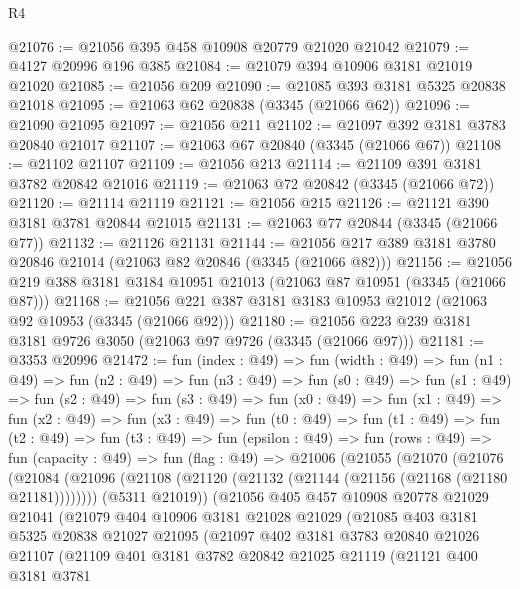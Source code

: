 \begin{lexlean}{R4}
\begin{coremodule}
@21076 := @21056 @395 @458 @10908 @20779 @21020 @21042
@21079 := @4127 @20996 @196 @385
@21084 := @21079 @394 @10906 @3181 @21019 @21020
@21085 := @21056 @209
@21090 := @21085 @393 @3181 @5325 @20838 @21018
@21095 := @21063 @62 @20838 (@3345 (@21066 @62))
@21096 := @21090 @21095
@21097 := @21056 @211
@21102 := @21097 @392 @3181 @3783 @20840 @21017
@21107 := @21063 @67 @20840 (@3345 (@21066 @67))
@21108 := @21102 @21107
@21109 := @21056 @213
@21114 := @21109 @391 @3181 @3782 @20842 @21016
@21119 := @21063 @72 @20842 (@3345 (@21066 @72))
@21120 := @21114 @21119
@21121 := @21056 @215
@21126 := @21121 @390 @3181 @3781 @20844 @21015
@21131 := @21063 @77 @20844 (@3345 (@21066 @77))
@21132 := @21126 @21131
@21144 := @21056 @217 @389 @3181 @3780 @20846 @21014 (@21063 @82 @20846 (@3345 (@21066 @82)))
@21156 := @21056 @219 @388 @3181 @3184 @10951 @21013 (@21063 @87 @10951 (@3345 (@21066 @87)))
@21168 := @21056 @221 @387 @3181 @3183 @10953 @21012 (@21063 @92 @10953 (@3345 (@21066 @92)))
@21180 := @21056 @223 @239 @3181 @3181 @9726 @3050 (@21063 @97 @9726 (@3345 (@21066 @97)))
@21181 := @3353 @20996
@21472 := fun (index : @49) =>
  fun (width : @49) =>
  fun (n1 : @49) =>
  fun (n2 : @49) =>
  fun (n3 : @49) =>
  fun (s0 : @49) =>
  fun (s1 : @49) =>
  fun (s2 : @49) =>
  fun (s3 : @49) =>
  fun (x0 : @49) =>
  fun (x1 : @49) =>
  fun (x2 : @49) =>
  fun (x3 : @49) =>
  fun (t0 : @49) =>
  fun (t1 : @49) =>
  fun (t2 : @49) =>
  fun (t3 : @49) =>
  fun (epsilon : @49) =>
  fun (rows : @49) =>
  fun (capacity : @49) =>
  fun (flag : @49) =>
  @21006
    (@21055
      (@21070
        (@21076
          (@21084
            (@21096 (@21108 (@21120 (@21132 (@21144 (@21156 (@21168 (@21180 @21181))))))))
            (@5311 @21019))
          (@21056
            @405
            @457
            @10908
            @20778
            @21029
            @21041
            (@21079
              @404
              @10906
              @3181
              @21028
              @21029
              (@21085
                @403
                @3181
                @5325
                @20838
                @21027
                @21095
                (@21097
                  @402
                  @3181
                  @3783
                  @20840
                  @21026
                  @21107
                  (@21109
                    @401
                    @3181
                    @3782
                    @20842
                    @21025
                    @21119
                    (@21121
                      @400
                      @3181
                      @3781

\end{coremodule}
\end{lexlean}
